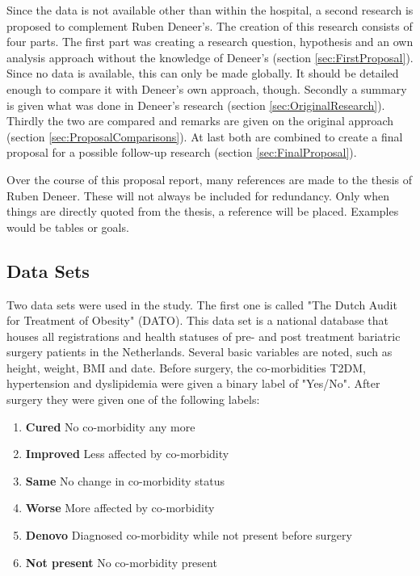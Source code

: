\documentclass[10pt,a4paper]{report}
\begin{document}
	Since the data is not available other than within the hospital, a second research is proposed to complement Ruben Deneer's. The creation of this research consists of four parts. The first part was creating a research question, hypothesis and an own analysis approach without the knowledge of Deneer's (section \ref{sec:FirstProposal}). Since no data is available, this can only be made globally. It should be detailed enough to compare it with Deneer's own approach, though. Secondly a summary is given what was done in Deneer's research (section \ref{sec:OriginalResearch}). Thirdly the two are compared and remarks are given on the original approach (section \ref{sec:ProposalComparisons}). At last both are combined to create a final proposal for a possible follow-up research (section \ref{sec:FinalProposal}). 
	
	Over the course of this proposal report, many references are made to the thesis of Ruben Deneer. These will not always be included for redundancy. Only when things are directly quoted from the thesis, a reference will be placed. Examples would be tables or goals.
	
	\subsection{Data Sets}
	\label{subsec:DataSets}
	
	Two data sets were used in the study. The first one is called "The Dutch Audit for Treatment of Obesity" (DATO). This data set is a national database that houses all registrations and health statuses of pre- and post treatment bariatric surgery patients in the Netherlands. Several basic variables are noted, such as height, weight, BMI and date. Before surgery, the co-morbidities T2DM, hypertension and dyslipidemia were given a binary label of "Yes/No". After surgery they were given one of the following labels:
	
	\begin{enumerate}
		\item \textbf{Cured} No co-morbidity any more		
		\item \textbf{Improved} Less affected by co-morbidity
		\item \textbf{Same} No change in co-morbidity status
		\item \textbf{Worse} More affected by co-morbidity
		\item \textbf{Denovo} Diagnosed co-morbidity while not present before surgery
		\item \textbf{Not present} No co-morbidity present				
	\end{enumerate}
	
\end{document}
